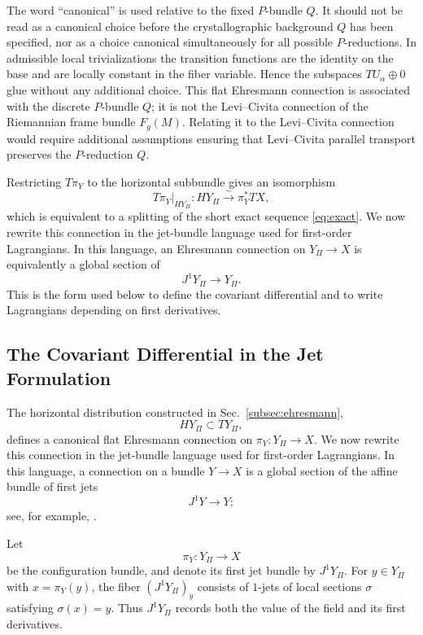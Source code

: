 \documentclass[11pt]{amsart}
\theoremstyle{plain}
\theoremstyle{definition}
\theoremstyle{remark}
\begin{document}
The word ``canonical'' is used relative to the fixed \(P\)-bundle \(Q\). 
It should not be read as a canonical choice before the crystallographic background \(Q\) has been specified, nor as a choice canonical simultaneously for all possible \(P\)-reductions. 
In admissible local trivializations the transition functions are the identity on the base and are locally constant in the fiber variable. 
Hence the subspaces \(TU_\alpha\oplus 0\) glue without any additional choice. 
This flat Ehresmann connection is associated with the discrete \(P\)-bundle \(Q\); it is not the Levi--Civita connection of the Riemannian frame bundle \(F_g(M)\). 
Relating it to the Levi--Civita connection would require additional assumptions ensuring that Levi--Civita parallel transport preserves the \(P\)-reduction \(Q\).

Restricting \(T\pi_Y\) to the horizontal subbundle gives an isomorphism
\begin{equation}
	T\pi_Y|_{HY_\Pi}:HY_\Pi\xrightarrow{\sim}\pi_Y^*TX,
	\label{eq:TpiY_horizontal_iso}
\end{equation}
which is equivalent to a splitting of the short exact sequence \eqref{eq:exact}.
We now rewrite this connection in the jet-bundle language used for first-order Lagrangians. 
In this language, an Ehresmann connection on \(Y_\Pi\to X\) is equivalently a global section of
\[
J^1Y_\Pi\to Y_\Pi .
\]
This is the form used below to define the covariant differential and to write Lagrangians depending on first derivatives.

\subsection{The Covariant Differential in the Jet Formulation}
\label{subsec:jet_covariant}

The horizontal distribution constructed in Sec.~\ref{subsec:ehresmann},
\[
HY_\Pi \subset TY_\Pi,
\]
defines a canonical flat Ehresmann connection on \(\pi_Y:Y_\Pi\to X\). 
We now rewrite this connection in the jet-bundle language used for first-order Lagrangians. 
In this language, a connection on a bundle \(Y\to X\) is a global section of the affine bundle of first jets
\[
J^1Y \to Y;
\]
see, for example, \cite{SardanashvilyBook,GiachettaBook}.

Let
\[
\pi_Y:Y_\Pi\to X
\]
be the configuration bundle, and denote its first jet bundle by \(J^1Y_\Pi\). 
For \(y\in Y_\Pi\) with \(x=\pi_Y(y)\), the fiber \((J^1Y_\Pi)_y\) consists of \(1\)-jets of local sections \(\sigma\) satisfying \(\sigma(x)=y\). 
Thus \(J^1Y_\Pi\) records both the value of the field and its first derivatives.
\end{document}
